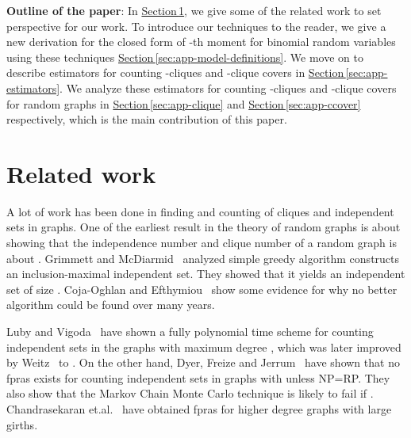 \documentclass[runningheads,a4paper]{llncs}
\newcounter{obs}
\newcommand{\Sec}[1]{\hyperref[sec:#1]{Section\,\ref*{sec:#1}}} \newcommand{\Eqn}[1]{\hyperref[eq:#1]{(\ref*{eq:#1})}} \newcommand{\Fig}[1]{\hyperref[fig:#1]{Fig.\,\ref*{fig:#1}}} \newcommand{\Tab}[1]{\hyperref[tab:#1]{Tab.\,\ref*{tab:#1}}} \newcommand{\Thm}[1]{\hyperref[thm:#1]{Theorem\,\ref*{thm:#1}}} \newcommand{\Fact}[1]{\hyperref[fact:#1]{Fact\,\ref*{fact:#1}}} \newcommand{\Lem}[1]{\hyperref[lem:#1]{Lemma\,\ref*{lem:#1}}} \newcommand{\Prop}[1]{\hyperref[prop:#1]{Prop.~\ref*{prop:#1}}} \newcommand{\Cor}[1]{\hyperref[cor:#1]{Corollary~\ref*{cor:#1}}} \newcommand{\Conj}[1]{\hyperref[conj:#1]{Conjecture~\ref*{conj:#1}}} \newcommand{\Def}[1]{\hyperref[def:#1]{Definition~\ref*{def:#1}}} \newcommand{\Alg}[1]{\hyperref[alg:#1]{Algorithm~\ref*{alg:#1}}} \newcommand{\Ex}[1]{\hyperref[ex:#1]{Ex.~\ref*{ex:#1}}} \newcommand{\Clm}[1]{\hyperref[clm:#1]{Claim~\ref*{clm:#1}}} \newcommand{\Obs}[1]{\hyperref[obs:#1]{Observation~\ref*{clm:#1}}}
\begin{document}
\textbf{Outline of the paper}: In \Sec{app-prev}, we give some of the related work to set perspective for our work. 
To introduce our techniques to the reader, we give a new derivation for the closed form of  -th moment for binomial random variables using these techniques \Sec{app-model-definitions}. 
We move on to describe estimators for counting -cliques and -clique covers in \Sec{app-estimators}. We analyze these estimators for counting -cliques and -clique covers for random graphs in \Sec{app-clique} and \Sec{app-ccover} respectively, which is the main contribution of this paper. 

\section{Related work}\label{sec:app-prev}
A lot of work has been done in finding and counting of cliques and independent sets in graphs. One of the earliest result in the theory of random graphs is about showing that the independence number and clique number of a random graph  is about . 
Grimmett and McDiarmid~\cite{GM75} analyzed simple greedy algorithm constructs an inclusion-maximal independent set. They showed that it yields an independent set of size . Coja-Oghlan and Efthymiou~\cite{CE11} show some evidence for why no better algorithm could be found over many years. 

Luby and Vigoda~\cite{LV97} have shown a fully polynomial time scheme for counting independent sets in the graphs with maximum degree , which was later improved by Weitz~\cite{W06} to . On the other hand,
 Dyer, Freize and Jerrum~\cite{DFJ02} have shown that no fpras exists for counting independent sets in graphs with  unless NP=RP. They also show that 
the Markov Chain Monte Carlo technique is likely to fail if . Chandrasekaran et.al.~\cite{CCGSS11} have obtained fpras for higher degree graphs with large girths. 
\end{document}
